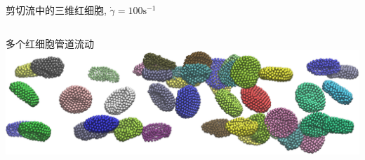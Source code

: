 \begin{frame}{剪切流中的三维红细胞, $\dot{\gamma}=100 \mathrm{s}^{-1}$}
\begin{columns}
\begin{column}[c]{0.5\textwidth}
\begin{center}
\end{center}
\end{column}
\begin{column}[c]{0.5\textwidth}

\vspace{-2.6em}
\end{column}
\end{columns}
\end{frame}


\begin{frame}{多个红细胞管道流动}
\includegraphics[width=\textwidth]{./figures/rbc.png}
\end{frame}
